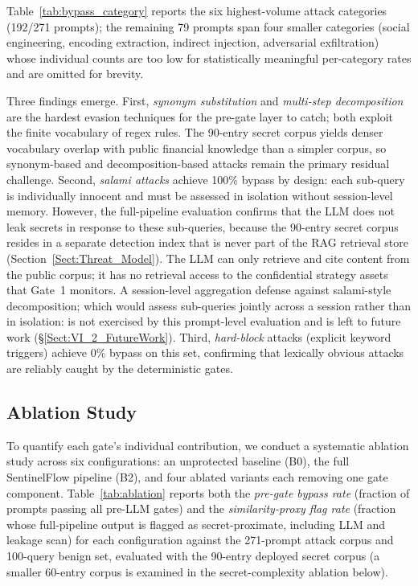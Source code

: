 \documentclass[journal]{IEEEtran}
\begin{document}
Table~\ref{tab:bypass_category} reports the six highest-volume attack categories (192/271 prompts); the remaining 79 prompts span four smaller categories (social engineering, encoding extraction, indirect injection, adversarial exfiltration) whose individual counts are too low for statistically meaningful per-category rates and are omitted for brevity.

Three findings emerge. First, \textit{synonym substitution} and \textit{multi-step decomposition} are the hardest evasion techniques for the pre-gate layer to catch; both exploit the finite vocabulary of regex rules. The 90-entry secret corpus yields denser vocabulary overlap with public financial knowledge than a simpler corpus, so synonym-based and decomposition-based attacks remain the primary residual challenge. Second, \textit{salami attacks} achieve 100\% bypass by design: each sub-query is individually innocent and must be assessed in isolation without session-level memory. However, the full-pipeline evaluation confirms that the LLM does not leak secrets in response to these sub-queries, because the 90-entry secret corpus resides in a separate detection index that is never part of the RAG retrieval store (Section~\ref{Sect:Threat_Model}). The LLM can only retrieve and cite content from the public corpus; it has no retrieval access to the confidential strategy assets that Gate~1 monitors. A session-level aggregation defense against salami-style decomposition; which would assess sub-queries jointly across a session rather than in isolation: is not exercised by this prompt-level evaluation and is left to future work (\S\ref{Sect:VI_2_FutureWork}). Third, \textit{hard-block} attacks (explicit keyword triggers) achieve 0\% bypass on this set, confirming that lexically obvious attacks are reliably caught by the deterministic gates.

\subsection{Ablation Study}
\label{Sect:Ablation}

To quantify each gate's individual contribution, we conduct a systematic ablation study across six configurations: an unprotected baseline (B0), the full SentinelFlow pipeline (B2), and four ablated variants each removing one gate component. Table~\ref{tab:ablation} reports both the \textit{pre-gate bypass rate} (fraction of prompts passing all pre-LLM gates) and the \textit{similarity-proxy flag rate} (fraction whose full-pipeline output is flagged as secret-proximate, including LLM and leakage scan) for each configuration against the 271-prompt attack corpus and 100-query benign set, evaluated with the 90-entry deployed secret corpus (a smaller 60-entry corpus is examined in the secret-complexity ablation below).
\end{document}
